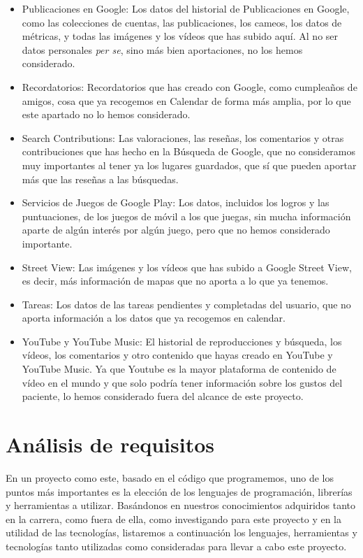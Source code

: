 \begin{itemize}
	\item Publicaciones en Google: Los datos del historial de Publicaciones en Google, como las colecciones de cuentas, las publicaciones, los cameos, los datos de métricas, y todas las imágenes y los vídeos que has subido aquí. Al no ser datos personales \textit{per se}, sino más bien aportaciones, no los hemos considerado.
	
	\item Recordatorios: Recordatorios que has creado con Google, como cumpleaños de amigos, cosa que ya recogemos en Calendar de forma más amplia, por lo que este apartado no lo hemos considerado.
	
	\item Search Contributions: Las valoraciones, las reseñas, los comentarios y otras contribuciones que has hecho en la Búsqueda de Google, que no consideramos muy importantes al tener ya los lugares guardados, que sí que pueden aportar más que las reseñas a las búsquedas.
	
	\item Servicios de Juegos de Google Play: Los datos, incluidos los logros y las puntuaciones, de los juegos de móvil a los que juegas, sin mucha información aparte de algún interés por algún juego, pero que no hemos considerado importante.
	
	\item Street View: Las imágenes y los vídeos que has subido a Google Street View, es decir, más información de mapas que no aporta a lo que ya tenemos.
	
	\item Tareas: Los datos de las tareas pendientes y completadas del usuario, que no aporta información a los datos que ya recogemos en calendar.
	
	\item YouTube y YouTube Music: El historial de reproducciones y búsqueda, los vídeos, los comentarios y otro contenido que hayas creado en YouTube y YouTube Music. Ya que Youtube es la mayor plataforma de contenido de vídeo en el mundo y que solo podría tener información sobre los gustos del paciente, lo hemos considerado fuera del alcance de este proyecto.
	
\end{itemize}

\section{Análisis de requisitos}
En un proyecto como este, basado en el código que programemos, uno de los puntos más importantes es la elección de los lenguajes de programación, librerías y herramientas a utilizar. Basándonos en nuestros conocimientos adquiridos tanto en la carrera, como fuera de ella, como investigando para este proyecto y en la utilidad de las tecnologías, listaremos a continuación los lenguajes, herramientas y tecnologías tanto utilizadas como consideradas para llevar a cabo este proyecto.

